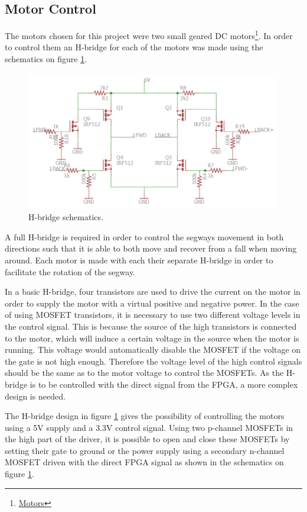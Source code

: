 
\subsection{Motor Control}
The motors chosen for this project were two small geared DC motors\footnote{ \href{https://www.sparkfun.com/products/13258}{Motors}}.
In order to control them an H-bridge for each of the motors was made using the schematics on figure \ref{fig:hbridge}.


\begin{figure}[H]
\centering
\includegraphics[width = 0.8 \textwidth]{images/hbridge_schematics}
\caption{H-bridge schematics.}
\label{fig:hbridge}
\end{figure}

A full H-bridge is required in order to control the segways movement in both directions such that it is able to both move and recover from a fall when moving around.
Each motor is made with each their separate H-bridge in order to facilitate the rotation of the segway.

In a basic H-bridge, four transistors are used to drive the current on the motor in order to supply the motor with a virtual positive and negative power.
In the case of using MOSFET transistors, it is necessary to use two different voltage levels in the control signal.
This is because the source of the high transistors is connected to the motor, which will induce a certain voltage in the source when the motor is running.
This voltage would automatically disable the MOSFET if the voltage on the gate is not high enough.
Therefore the voltage level of the high control signals should be the same as to the motor voltage to control the MOSFETs.
As the H-bridge is to be controlled with the direct signal from the FPGA, a more complex design is needed.

The H-bridge design in figure \ref{fig:hbridge} gives the possibility of controlling the motors using a 5V supply and a 3.3V control signal.
Using two p-channel MOSFETs in the high part of the driver, it is possible to open and close these MOSFETs by setting their gate to ground or the power supply using a secondary n-channel MOSFET driven with the direct FPGA signal as shown in the schematics on figure \ref{fig:hbridge}.


